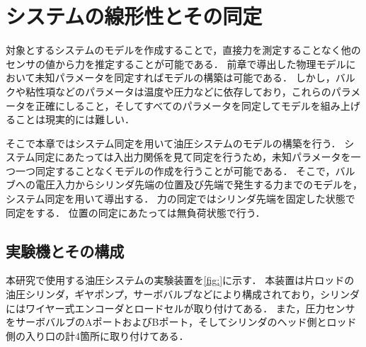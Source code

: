 \chapter{システムの線形性とその同定}
対象とするシステムのモデルを作成することで，直接力を測定することなく他のセンサの値から力を推定することが可能である．
前章で導出した物理モデルにおいて未知パラメータを同定すればモデルの構築は可能である．
しかし，バルクや粘性項などのパラメータは温度や圧力などに依存しており，これらのパラメータを正確にしること，そしてすべてのパラメータを同定してモデルを組み上げることは現実的には難しい．

そこで本章ではシステム同定を用いて油圧システムのモデルの構築を行う．
システム同定にあたっては入出力関係を見て同定を行うため，未知パラメータを一つ一つ同定することなくモデルの作成を行うことが可能である．
そこで，バルブへの電圧入力からシリンダ先端の位置及び先端で発生する力までのモデルを，システム同定を用いて導出する．
力の同定ではシリンダ先端を固定した状態で同定をする．
位置の同定にあたっては無負荷状態で行う．
\section{実験機とその構成}
本研究で使用する油圧システムの実験装置を\figname\ref{fig:}に示す．
本装置は片ロッドの油圧シリンダ，ギヤポンプ，サーボバルブなどにより構成されており，シリンダにはワイヤー式エンコーダとロードセルが取り付けてある．
また，圧力センサをサーボバルブのAポートおよびBポート，そしてシリンダのヘッド側とロッド側の入り口の計4箇所に取り付けてある．

